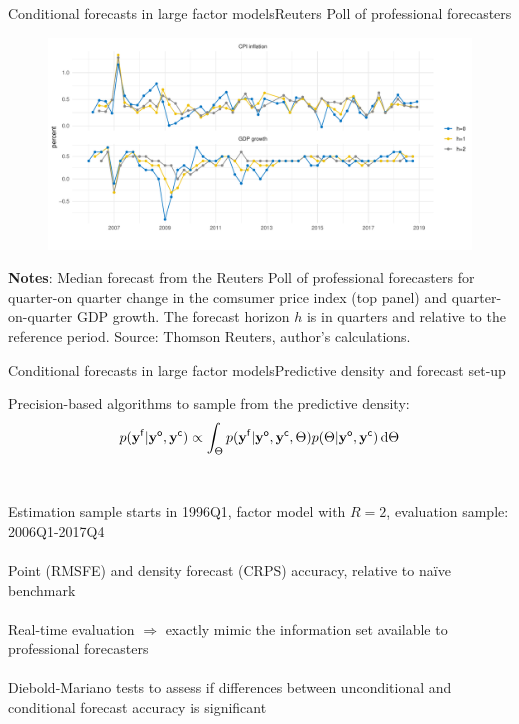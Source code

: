 \documentclass[xcolor=svgnames, 10pt, aspectratio=169]{beamer}
\begin{document}
\begin{frame}{Conditional forecasts in large factor models}{Reuters Poll of professional forecasters}    

    \begin{figure}
        \includegraphics[scale = 0.45]{fig_ReutersPoll.pdf}
    \end{figure}
    \begin{adjustbox}{minipage=0.8\textwidth,center}
            {\tiny \textbf{Notes}: Median forecast from the Reuters Poll of professional forecasters for quarter-on quarter change in the comsumer price index (top panel) and quarter-on-quarter GDP growth. The forecast horizon $h$ is in quarters and relative to the reference period. Source: Thomson Reuters, author's calculations.}\par
    \end{adjustbox} 
\end{frame}


\begin{frame}{Conditional forecasts in large factor models}{Predictive density and forecast set-up}

    Precision-based algorithms to sample from the predictive density: 
    $$p(\mathbf{y^{\sf{f}}}|\mathbf{y^{\sf{o}}}, \mathbf{y^{\sf{c}}}) \propto \int_{\Theta} p(\mathbf{y^{\sf{f}}}|\mathbf{y^{\sf{o}}},\mathbf{y^{\sf{c}}}, \Theta) p(\Theta|\mathbf{y^{\sf{o}}}, \mathbf{y^{\sf{c}}})\, \text{d}\Theta$$ \\~\\

    Estimation sample starts in 1996Q1, factor model with $R=2$, evaluation sample: 2006Q1-2017Q4 \\~\\

    Point (RMSFE) and density forecast (CRPS) accuracy, relative to na\"ive benchmark \\~\\

    Real-time evaluation $\Longrightarrow$ exactly mimic the information set available to professional forecasters \\~\\

    Diebold-Mariano tests to assess if differences between unconditional and conditional forecast accuracy is significant
\end{frame}
\end{document}
